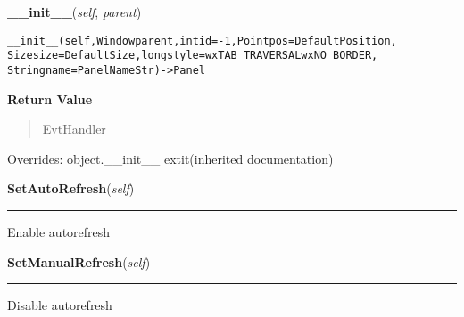 \hspace{.8\funcindent}\begin{boxedminipage}{\funcwidth}

    \raggedright \textbf{\_\_init\_\_}(\textit{self}, \textit{parent})

\setlength{\parskip}{2ex}
\begin{alltt}

\_\_init\_\_(self, Window parent, int id=-1, Point pos=DefaultPosition, 
    Size size=DefaultSize, long style=wxTAB\_TRAVERSAL{\textbar}wxNO\_BORDER, 
    String name=PanelNameStr) -{\textgreater} Panel
\end{alltt}

\setlength{\parskip}{1ex}
      \textbf{Return Value}
    \vspace{-1ex}

      \begin{quote}
      EvtHandler

      \end{quote}

      Overrides: object.\_\_init\_\_ 	extit{(inherited documentation)}

    \end{boxedminipage}

    \label{ImagePanel:ImagePanel:SetAutoRefresh}

    \vspace{0.5ex}

\hspace{.8\funcindent}\begin{boxedminipage}{\funcwidth}

    \raggedright \textbf{SetAutoRefresh}(\textit{self})

    \vspace{-1.5ex}

    \rule{\textwidth}{0.5\fboxrule}
\setlength{\parskip}{2ex}
    Enable autorefresh

\setlength{\parskip}{1ex}
    \end{boxedminipage}

    \label{ImagePanel:ImagePanel:SetManualRefresh}

    \vspace{0.5ex}

\hspace{.8\funcindent}\begin{boxedminipage}{\funcwidth}

    \raggedright \textbf{SetManualRefresh}(\textit{self})

    \vspace{-1.5ex}

    \rule{\textwidth}{0.5\fboxrule}
\setlength{\parskip}{2ex}
    Disable autorefresh

\setlength{\parskip}{1ex}
    \end{boxedminipage}

